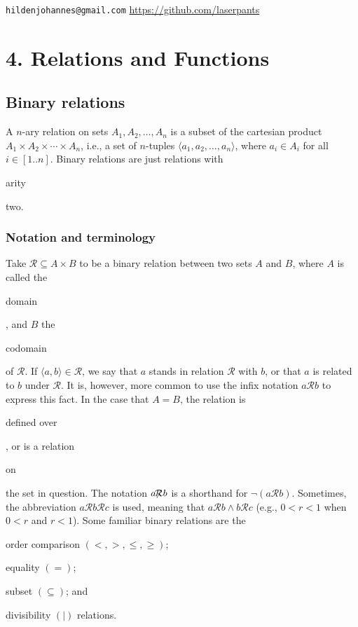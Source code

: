 \documentclass[11pt]{article}
\theoremstyle{plain}
\theoremstyle{definition}
\newenvironment{packed_items}{
\begin{itemize}
  \setlength{\itemsep}{1pt}
  \setlength{\parskip}{0pt}
  \setlength{\parsep}{0pt}
}{\end{itemize}}
\begin{document}
\noindent \verb|hildenjohannes@gmail.com| \hfill \url{https://github.com/laserpants}

\section*{4. Relations and Functions}

\subsection*{Binary relations}

A $ n $-ary relation on sets $ A_1, A_2, \dots, A_n $ is a subset of the cartesian product $ A_1 \times A_2 \times \cdots \times A_n $, i.e., a set of $ n $-tuples $ \langle a_1, a_2, \dots, a_n \rangle $, where $ a_i \in A_i $ for all $ i \in [1 .. n]$. Binary relations are just relations with \begin{em}arity\end{em} two.

\subsubsection*{Notation and terminology}

\noindent Take $ \mathcal{R} \subseteq A \times B $ to be a binary relation between two sets $ A $ and $ B $, where $ A $ is called the \begin{em}domain\end{em}, and $ B $ the \begin{em}codomain\end{em} of $ \mathcal{R} $. If $ \langle a, b \rangle \in \mathcal{R} $, we say that $ a $ stands in relation $ \mathcal{R} $ with $ b $, or that $ a $ is related to $ b $ under $ \mathcal{R} $. It is, however, more common to use the infix notation $ a \mathcal{R} b $ to express this fact. In the case that $ A = B $, the relation is \begin{em}defined over\end{em}, or is a relation \begin{em}on\end{em} the set in question.
The notation $ a \!\!\not\!\!\mathcal{R} b $ is a shorthand for $ \neg (a \mathcal{R} b) $.
Sometimes, the abbreviation $ a \mathcal{R} b \mathcal{R} c $ is used, meaning that $ a \mathcal{R} b \wedge b \mathcal{R} c $ (e.g., $ 0 < r < 1 $ when $ 0 < r $ and $ r < 1 $).
Some familiar binary relations are the

\begin{packed_items}
	\item order comparison $(<, >, \le, \ge)$;
	\item equality $(=)$;
	\item subset $(\subseteq)$; and
	\item divisibility $(|)$ relations.
\end{packed_items}
\end{document}
